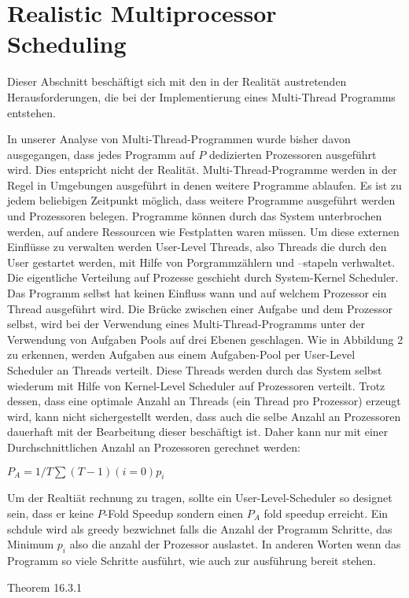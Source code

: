 \section{Realistic Multiprocessor Scheduling}

Dieser Abschnitt beschäftigt sich mit den in der Realität austretenden Herausforderungen, die bei der Implementierung eines Multi-Thread Programms entstehen. 


In unserer Analyse von Multi-Thread-Programmen wurde bisher davon ausgegangen, dass jedes Programm auf $P$ dedizierten Prozessoren ausgeführt wird. Dies entspricht nicht der Realität. Multi-Thread-Programme werden in der Regel in Umgebungen ausgeführt in denen weitere Programme ablaufen. Es ist zu jedem beliebigen Zeitpunkt möglich, dass weitere Programme ausgeführt werden und Prozessoren belegen. Programme können durch das System unterbrochen werden, auf andere Ressourcen wie Festplatten waren müssen.
Um diese externen Einflüsse zu verwalten werden User-Level Threads, also Threads die durch den User gestartet werden, mit Hilfe von Porgrammzählern und –stapeln verhwaltet. Die eigentliche Verteilung auf Prozesse geschieht durch System-Kernel Scheduler. Das Programm selbst hat keinen Einfluss wann und auf welchem Prozessor ein Thread ausgeführt wird.
Die Brücke zwischen einer Aufgabe und dem Prozessor selbst, wird bei der Verwendung eines Multi-Thread-Programms unter der Verwendung von Aufgaben Pools auf drei Ebenen geschlagen. Wie in Abbildung 2 zu erkennen, werden Aufgaben aus einem Aufgaben-Pool per User-Level Scheduler an Threads verteilt. Diese Threads werden durch das System selbst wiederum mit Hilfe von Kernel-Level Scheduler auf Prozessoren verteilt.
Trotz dessen, dass eine optimale Anzahl  an Threads (ein Thread pro Prozessor) erzeugt wird, kann nicht sichergestellt werden, dass auch die selbe Anzahl an Prozessoren dauerhaft mit der Bearbeitung dieser beschäftigt ist. Daher kann nur mit einer Durchschnittlichen Anzahl an Prozessoren gerechnet werden:

$P_A = 1/T \sum (T-1) (i= 0) p_i$

Um der Realtiät rechnung zu tragen, sollte ein User-Level-Scheduler so designet sein, dass er keine $P$-Fold Speedup sondern einen $P_A$ fold speedup erreicht. Ein schdule wird als greedy bezwichnet falls die Anzahl der Programm Schritte, das Minimum $p_i$ also die anzahl der Prozessor auslastet. In anderen Worten wenn das Programm so viele Schritte ausführt, wie auch zur ausführung bereit stehen.

Theorem 16.3.1


 
